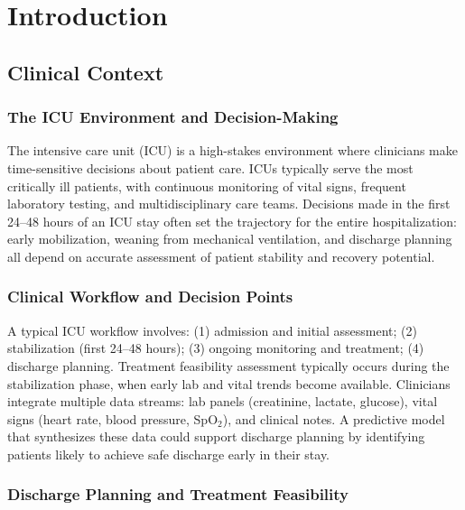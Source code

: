 \chapter{Introduction}
\label{ch:introduction}

\section{Clinical Context}

\subsection{The ICU Environment and Decision-Making}

The intensive care unit (ICU) is a high-stakes environment where clinicians make time-sensitive decisions about patient care. ICUs typically serve the most critically ill patients, with continuous monitoring of vital signs, frequent laboratory testing, and multidisciplinary care teams. Decisions made in the first 24--48 hours of an ICU stay often set the trajectory for the entire hospitalization: early mobilization, weaning from mechanical ventilation, and discharge planning all depend on accurate assessment of patient stability and recovery potential.

\subsection{Clinical Workflow and Decision Points}

A typical ICU workflow involves: (1) admission and initial assessment; (2) stabilization (first 24--48 hours); (3) ongoing monitoring and treatment; (4) discharge planning. Treatment feasibility assessment typically occurs during the stabilization phase, when early lab and vital trends become available. Clinicians integrate multiple data streams: lab panels (creatinine, lactate, glucose), vital signs (heart rate, blood pressure, SpO$_2$), and clinical notes. A predictive model that synthesizes these data could support discharge planning by identifying patients likely to achieve safe discharge early in their stay.

\subsection{Discharge Planning and Treatment Feasibility}

